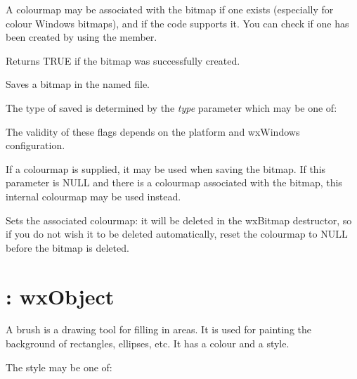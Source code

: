 A colourmap may be associated with the bitmap if one exists (especially for
colour Windows bitmaps), and if the code supports it. You can check
if one has been created by using the  member.



Returns TRUE if the bitmap was successfully created.



Saves a bitmap in the named file.

The type of saved is determined by the {\it type} parameter which may be one of:

\begin{twocollist}\itemsep=0pt
\end{twocollist}

The validity of these flags depends on the platform and wxWindows configuration.

If a colourmap is supplied, it may be used when saving the bitmap. If this
parameter is NULL and there is a colourmap associated with the bitmap, this
internal colourmap may be used instead.



Sets the associated colourmap: it will be deleted in the wxBitmap
destructor, so if you do not wish it to be deleted automatically,
reset the colourmap to NULL before the bitmap is deleted.

\section{: wxObject}\label{wxbrush}

A brush is a drawing tool for filling in areas. It is used for painting
the background of rectangles, ellipses, etc.  It has a colour and a
style.

The style may be one of:

